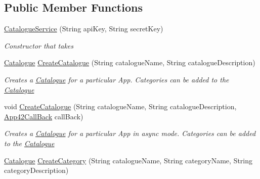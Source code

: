 \subsection*{Public Member Functions}
\begin{DoxyCompactItemize}
\item 
\hyperlink{classcom_1_1shephertz_1_1app42_1_1paas_1_1sdk_1_1csharp_1_1shopping_1_1_catalogue_service_a013f7b3946340f11ce3df41655a2ab38}{Catalogue\+Service} (String api\+Key, String secret\+Key)
\begin{DoxyCompactList}\small\item\em Constructor that takes \end{DoxyCompactList}\item 
\hyperlink{classcom_1_1shephertz_1_1app42_1_1paas_1_1sdk_1_1csharp_1_1shopping_1_1_catalogue}{Catalogue} \hyperlink{classcom_1_1shephertz_1_1app42_1_1paas_1_1sdk_1_1csharp_1_1shopping_1_1_catalogue_service_a5f0a8393274f2e91be5afb036d8f70db}{Create\+Catalogue} (String catalogue\+Name, String catalogue\+Description)
\begin{DoxyCompactList}\small\item\em Creates a \hyperlink{classcom_1_1shephertz_1_1app42_1_1paas_1_1sdk_1_1csharp_1_1shopping_1_1_catalogue}{Catalogue} for a particular App. Categories can be added to the \hyperlink{classcom_1_1shephertz_1_1app42_1_1paas_1_1sdk_1_1csharp_1_1shopping_1_1_catalogue}{Catalogue} \end{DoxyCompactList}\item 
void \hyperlink{classcom_1_1shephertz_1_1app42_1_1paas_1_1sdk_1_1csharp_1_1shopping_1_1_catalogue_service_a80387fa0825d70aab0a8e0d61a3243f8}{Create\+Catalogue} (String catalogue\+Name, String catalogue\+Description, \hyperlink{interfacecom_1_1shephertz_1_1app42_1_1paas_1_1sdk_1_1csharp_1_1_app42_call_back}{App42\+Call\+Back} call\+Back)
\begin{DoxyCompactList}\small\item\em Creates a \hyperlink{classcom_1_1shephertz_1_1app42_1_1paas_1_1sdk_1_1csharp_1_1shopping_1_1_catalogue}{Catalogue} for a particular App in async mode. Categories can be added to the \hyperlink{classcom_1_1shephertz_1_1app42_1_1paas_1_1sdk_1_1csharp_1_1shopping_1_1_catalogue}{Catalogue} \end{DoxyCompactList}\item 
\hyperlink{classcom_1_1shephertz_1_1app42_1_1paas_1_1sdk_1_1csharp_1_1shopping_1_1_catalogue}{Catalogue} \hyperlink{classcom_1_1shephertz_1_1app42_1_1paas_1_1sdk_1_1csharp_1_1shopping_1_1_catalogue_service_a8fabc644a0e1f44981475aae7b91c3f7}{Create\+Category} (String catalogue\+Name, String category\+Name, String category\+Description)

\end{DoxyCompactItemize}
